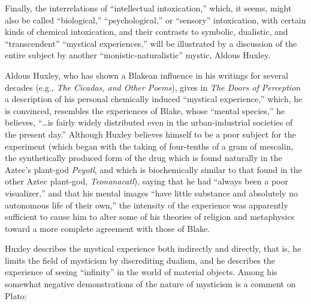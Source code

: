 Finally, the interrelations of \enquote{intellectual intoxication,}
which, it seems, might also be called \enquote{biological,} \enquote{psychological,}
or \enquote{sensory} intoxication, with certain kinds of chemical intoxication,
and their contrasts to symbolic, dualistic, and \enquote{transcendent} \enquote{mystical
experiences,} will be illustrated by a discussion of the entire
subject by another \enquote{monistic-naturalistic} mystic, Aldous Huxley.

\label{self:09}

Aldous Huxley, who has shown a Blakean influence in his
writings for several decades (e.g., \emph{The Cicadas, and Other Poems}), gives
in \emph{The Doors of Perception} a description of his
personal chemically induced \enquote{mystical experience,} which, he
is convinced, resembles the experiences of Blake, whose
\enquote{mental species,} he believes, \enquote{\dots is fairly widely distributed
even in the urban-industrial societies of the present day.}\supercite{huxley:doors-of-perception}
Although Huxley believes himself to be a poor subject for the experiment
(which began with the taking of four-tenths of a gram of mescalin, the synthetically produced
form of the drug which is found naturally in the Aztec's plant-god \emph{Peyotl},
and which is biochemically similar to that found in the other
Aztec plant-god, \emph{Teonanacatl}), saying that he had \enquote{always been
a poor visualizer,} and that his mental images \enquote{have little
substance and absolutely no autonomous life of their own,}
the intensity of the experience was apparently sufficient to
cause him to alter some of his theories of religion and metaphysics
toward a more complete agreement with those of Blake.\supercite{huxley:doors-of-perception}

Huxley describes the mystical experience both indirectly
and directly, that is, he limits the field of mysticism by
discrediting dualism, and he describes the experience of
seeing \enquote{infinity} in the world of material objects. Among
his somewhat negative demonstrations of the nature of mysticism
is a comment on Plato:


